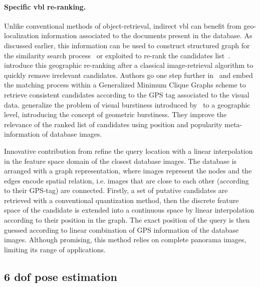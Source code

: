 \paragraph{Specific \ac{vbl} re-ranking.}
Unlike conventional methods of object-retrieval, indirect \ac{vbl} can benefit from geo-localization information associated to the documents present in the database. As discussed earlier, this information can be used to construct structured graph for the similarity search process~\citep{Torii2011,Cao2013} or exploited to re-rank the candidates list~\citep{Zamir2010,Zamir2014,Sattler2016}. \citet{Zamir2010} introduce this geographic re-ranking after a classical image-retrieval algorithm to quickly remove irrelevant candidates. Authors go one step further in~\citep{Zamir2014} and embed the matching process within a Generalized Minimum Clique Graphs scheme to retrieve consistent candidates according to the GPS tag associated to the visual data. \citet{Sattler2016} generalize the problem of visual burstiness introduced by~\citep{Jegou2009} to a geographic level, introducing the concept of geometric burstiness. They improve the relevance of the ranked list of candidates using position and popularity meta-information of database images.

Innovative contribution from \citet{Torii2011} refine the query location with a linear interpolation in the feature space domain of the closest database images. The database is arranged with a graph representation, where images represent the nodes and the edges encode spatial relation, i.e. images that are close to each other (according to their GPS-tag) are connected. Firstly, a set of putative candidates are retrieved with a conventional quantization method, then the discrete feature space of the candidate is extended into a continuous space by linear interpolation according to their position in the graph. The exact position of the query is then guessed according to linear combination of GPS information of the database images. Although promising, this method relies on complete panorama images, limiting its range of applications.

\subsection{6 \acs*{dof} pose estimation}
\label{subsec:fine_pose_estimation}

